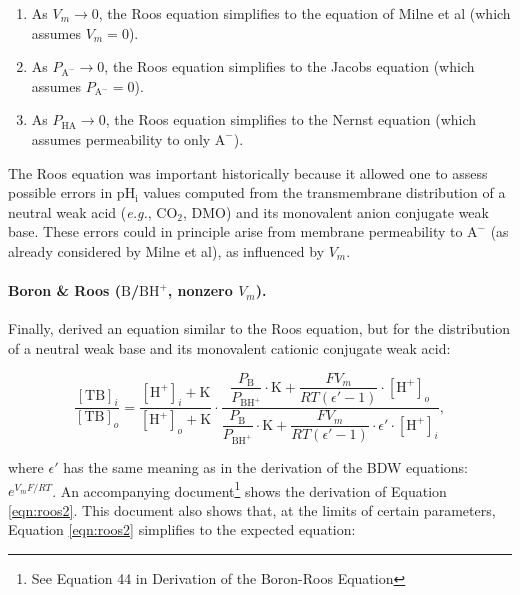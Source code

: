\documentclass[fleqn,10pt]{physiome}
\begin{document}
\begin{enumerate}[noitemsep] 
\item As $V_m \rightarrow 0$, the Roos equation simplifies to the equation of Milne et al (which assumes $V_m=0$).

\item As $P_\mathrm{A^-} \rightarrow 0$, the Roos equation simplifies to the Jacobs equation (which assumes $P_\mathrm{A^-}=0$).

\item As $P_\mathrm{HA} \rightarrow 0$, the Roos equation simplifies to the Nernst equation (which assumes permeability to only $\mathrm{A^-}$).
\end{enumerate}

The Roos equation was important historically because it allowed one to assess possible errors in $\mathrm{pH_i}$ values computed from the transmembrane distribution of a neutral weak acid (\emph{e.g.}, $\mathrm{CO_2}$, DMO) and its monovalent anion conjugate weak base. These errors could in principle arise from membrane permeability to $\mathrm{A^-}$ (as already considered by Milne et al), as influenced by $V_m$.


\paragraph{Boron \& Roos ($\mathrm{B}$/$\mathrm{BH^+}$, nonzero $V_m$).} Finally, \cite{boron1976comparison} derived an equation similar to the Roos equation, but for the distribution of a neutral weak base and its monovalent cationic conjugate weak acid:

\begin{equation}
\dfrac{\mathrm{[TB]}_i}{\mathrm{[TB]}_o}=\dfrac{\mathrm{[H^+]}_i+\mathrm{K}}{\mathrm{[H^+]}_o+\mathrm{K}}\cdot \dfrac{\dfrac{P_\mathrm{B}}{P_\mathrm{BH^+}}\cdot\mathrm{K}+\dfrac{FV_m}{RT(\epsilon '-1)}\cdot\mathrm{[H^+]}_o}{\dfrac{P_\mathrm{B}}{P_\mathrm{BH^+}}\cdot\mathrm{K}+\dfrac{FV_m}{RT(\epsilon '-1)}\cdot\epsilon '\cdot\mathrm{[H^+]}_i},
\label{eqn:roos2}
\end{equation}

where $\epsilon '$ has the same meaning as in the derivation of the BDW equations: $e^{V_mF/RT}$. An accompanying document\footnote{See Equation 44 in Derivation of the Boron-Roos Equation} shows the derivation of Equation \ref{eqn:roos2}. This document also shows that, at the limits of certain parameters, Equation \ref{eqn:roos2} simplifies to the expected equation:
\end{document}
